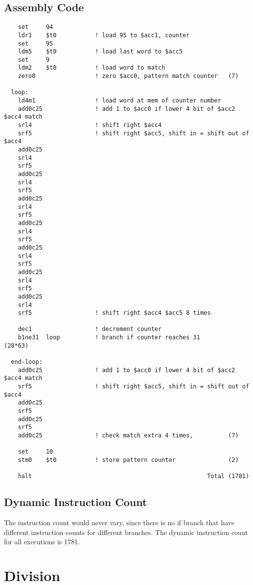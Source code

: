 \documentclass{article}
\begin{document}
  \subsection{Assembly Code}
  \begin{lstlisting}
    set     94
    ldr1    $t0           ! load 95 to $acc1, counter
    set     95
    ldm5    $t0           ! load last word to $acc5
    set     9
    ldm2    $t0           ! load word to match
    zero0                 ! zero $acc0, pattern match counter   (7)

  loop:
    ld4m1                 ! load word at mem of counter number
    add0c25               ! add 1 to $acc0 if lower 4 bit of $acc2 $acc4 match
    srl4                  ! shift right $acc4
    srf5                  ! shift right $acc5, shift in = shift out of $acc4
    add0c25
    srl4
    srf5
    add0c25
    srl4
    srf5
    add0c25
    srl4
    srf5
    add0c25
    srl4
    srf5
    add0c25
    srl4
    srf5
    add0c25
    srl4
    srf5
    add0c25
    srl4
    srf5                  ! shift right $acc4 $acc5 8 times

    dec1                  ! decrement counter
    b1ne31  loop          ! branch if counter reaches 31        (28*63)

  end-loop:
    add0c25               ! add 1 to $acc0 if lower 4 bit of $acc2 $acc4 match
    srf5                  ! shift right $acc5, shift in = shift out of $acc4
    add0c25
    srf5
    add0c25
    srf5
    add0c25               ! check match extra 4 times,          (7)

    set     10
    stm0    $t0           ! store pattern counter               (2)

    halt                                                  Total (1781)
  \end{lstlisting}
  \subsection{Dynamic Instruction Count}
  \qquad The instruction count would never vary, since there is no if branch that have different
  instruction counts for different branches. The dynamic instruction count for all executions is 1781.
  \section{Division}
\end{document}
